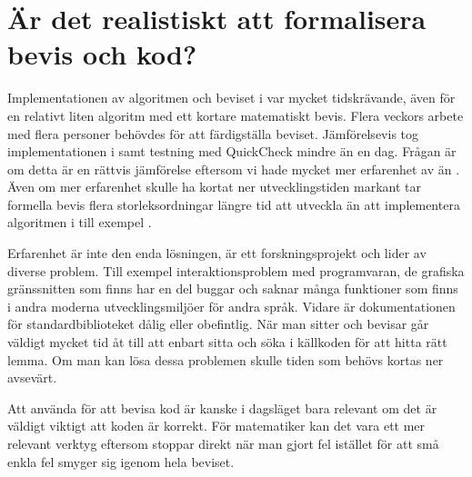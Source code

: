 \section{Är det realistiskt att formalisera bevis och kod?}
Implementationen av algoritmen och beviset i \coq{} var mycket tidskrävande,
även för en relativt liten algoritm med ett kortare matematiskt bevis. Flera
veckors arbete med flera personer behövdes för att färdigställa beviset.
Jämförelsevis tog implementationen i \haskell{} samt testning med QuickCheck
mindre än en dag. Frågan är om detta är en rättvis jämförelse eftersom vi hade
mycket mer erfarenhet av \haskell{} än \coq{}. Även om mer erfarenhet skulle ha
kortat ner utvecklingstiden markant tar formella bevis flera storleksordningar
längre tid att utveckla än att implementera algoritmen i till exempel \haskell{}.

Erfarenhet är inte den enda lösningen, \coq{} är ett forskningsprojekt och
lider av diverse problem. Till exempel interaktionsproblem med programvaran, de
grafiska gränssnitten som finns har en del buggar och saknar många funktioner
som finns i andra moderna utvecklingsmiljöer för andra språk. Vidare är
dokumentationen för standardbiblioteket dålig eller obefintlig. När man sitter
och bevisar går väldigt mycket tid åt till att enbart sitta och söka i
källkoden för att hitta rätt lemma. Om man kan lösa dessa problemen skulle
tiden som behövs kortas ner avsevärt.

Att använda \coq{} för att bevisa kod är kanske i dagsläget bara relevant om
det är väldigt viktigt att koden är korrekt. För matematiker kan det vara ett
mer relevant verktyg eftersom \coq{} stoppar direkt när man gjort fel istället
för att små enkla fel smyger sig igenom hela beviset.

